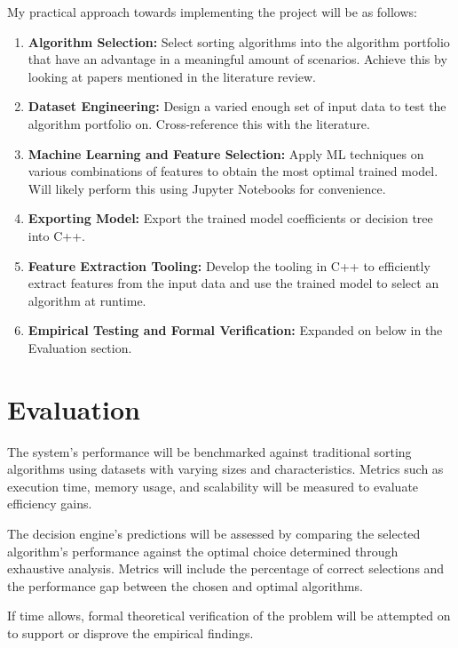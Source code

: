 \documentclass[twocolumn]{article}
\begin{document}
\noindent My practical approach towards implementing the project will be as follows:
\begin{enumerate}
    \item \textbf{Algorithm Selection:} Select sorting algorithms into the algorithm portfolio that have an advantage in a meaningful amount of scenarios. Achieve this by looking at papers mentioned in the literature review.
    \item \textbf{Dataset Engineering:} Design a varied enough set of input data to test the algorithm portfolio on. Cross-reference this with the literature.
    \item \textbf{Machine Learning and Feature Selection:} Apply ML techniques on various combinations of features to obtain the most optimal trained model. Will likely perform this using Jupyter Notebooks for convenience.
    \item \textbf{Exporting Model:} Export the trained model coefficients or decision tree into C++.
    \item \textbf{Feature Extraction Tooling:} Develop the tooling in C++ to efficiently extract features from the input data and use the trained model to select an algorithm at runtime.
    \item \textbf{Empirical Testing and Formal Verification:} Expanded on below in the Evaluation section.
\end{enumerate}

\section{Evaluation}
The system's performance will be benchmarked against traditional sorting algorithms using datasets with varying sizes and characteristics. Metrics such as execution time, memory usage, and scalability will be measured to evaluate efficiency gains.

The decision engine's predictions will be assessed by comparing the selected algorithm's performance against the optimal choice determined through exhaustive analysis. Metrics will include the percentage of correct selections and the performance gap between the chosen and optimal algorithms.

If time allows, formal theoretical verification of the problem will be attempted on to support or disprove the empirical findings.



\end{document}
